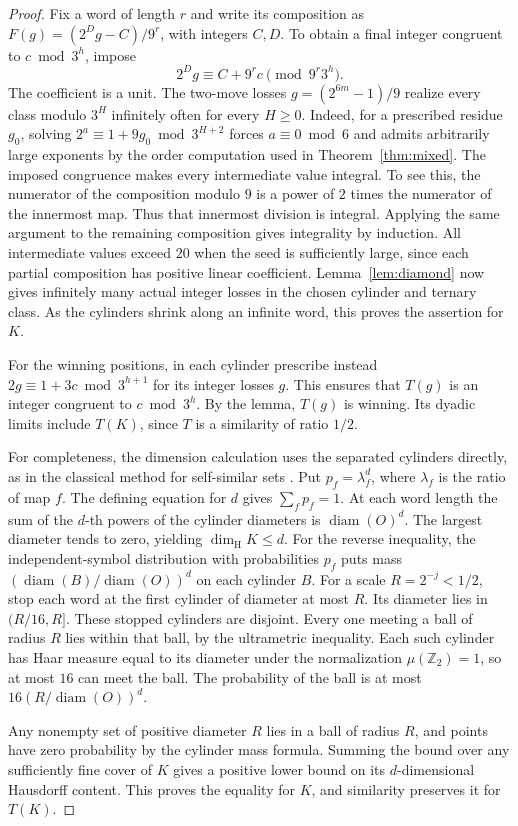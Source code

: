 \documentclass[11pt]{article}
\newcommand{\dimH}{\dim_{\mathrm H}}
\newcommand{\Z}{\mathbb Z}
\begin{document}
\begin{proof}
Fix a word of length \(r\) and write its composition as \(F(g)=(2^Dg-C)/9^r\), with integers \(C,D\). To obtain a final integer congruent to \(c\bmod3^h\), impose
\[
 2^Dg\equiv C+9^r c\pmod{9^r3^h}.
\]
The coefficient is a unit. The two-move losses \(g=(2^{6m}-1)/9\) realize every class modulo \(3^H\) infinitely often for every \(H\ge0\). Indeed, for a prescribed residue \(g_0\), solving \(2^a\equiv1+9g_0\bmod3^{H+2}\) forces \(a\equiv0\bmod6\) and admits arbitrarily large exponents by the order computation used in Theorem~\ref{thm:mixed}. The imposed congruence makes every intermediate value integral. To see this, the numerator of the composition modulo \(9\) is a power of \(2\) times the numerator of the innermost map. Thus that innermost division is integral. Applying the same argument to the remaining composition gives integrality by induction. All intermediate values exceed \(20\) when the seed is sufficiently large, since each partial composition has positive linear coefficient. Lemma~\ref{lem:diamond} now gives infinitely many actual integer losses in the chosen cylinder and ternary class. As the cylinders shrink along an infinite word, this proves the assertion for \(K\).

For the winning positions, in each cylinder prescribe instead \(2g\equiv1+3c\bmod3^{h+1}\) for its integer losses \(g\). This ensures that \(T(g)\) is an integer congruent to \(c\bmod3^h\). By the lemma, \(T(g)\) is winning. Its dyadic limits include \(T(K)\), since \(T\) is a similarity of ratio \(1/2\).

For completeness, the dimension calculation uses the separated cylinders directly, as in the classical method for self-similar sets \cite{hutchinson}. Put \(p_f=\lambda_f^d\), where \(\lambda_f\) is the ratio of map \(f\). The defining equation for \(d\) gives \(\sum_f p_f=1\). At each word length the sum of the \(d\)-th powers of the cylinder diameters is \(\operatorname{diam}(O)^d\). The largest diameter tends to zero, yielding \(\dimH K\le d\). For the reverse inequality, the independent-symbol distribution with probabilities \(p_f\) puts mass \((\operatorname{diam}(B)/\operatorname{diam}(O))^d\) on each cylinder \(B\). For a scale \(R=2^{-j}<1/2\), stop each word at the first cylinder of diameter at most \(R\). Its diameter lies in \((R/16,R]\). These stopped cylinders are disjoint. Every one meeting a ball of radius \(R\) lies within that ball, by the ultrametric inequality. Each such cylinder has Haar measure equal to its diameter under the normalization \(\mu(\Z_2)=1\), so at most \(16\) can meet the ball. The probability of the ball is at most \(16(R/\operatorname{diam}(O))^d\).

Any nonempty set of positive diameter \(R\) lies in a ball of radius \(R\), and points have zero probability by the cylinder mass formula. Summing the bound over any sufficiently fine cover of \(K\) gives a positive lower bound on its \(d\)-dimensional Hausdorff content. This proves the equality for \(K\), and similarity preserves it for \(T(K)\).
\end{proof}
\end{document}
